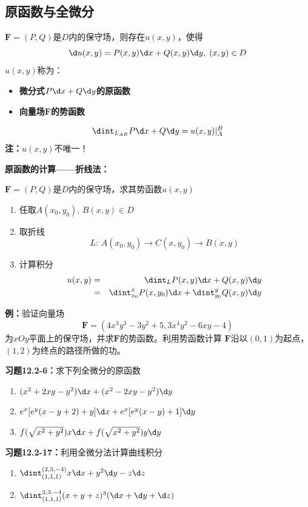 \subsection{原函数与全微分}

$\bm{F}=(P,Q)$是$D$内的保守场，则存在$u(x,y)$，使得
$$\d u(x,y)=P(x,y)\d x+Q(x,y)\d y,\;(x,y)\in D$$
 $u(x,y)$称为： 
\begin{itemize}
  \item {\bf 微分式$P\d x+Q\d y$的原函数} 
  \item {\bf 向量场$\bm{F}$的势函数} 
\end{itemize}
\bigskip
$${\dint_{L_{AB}}P\d x+Q\d y=u(x,y)|_A^B} $$
{\bf 注：}$u(x,y)$不唯一！

{\bf 原函数的计算——折线法：}

$\bm{F}=(P,Q)$是$D$内的保守场，求其势函数$u(x,y)$

\begin{enumerate}[Step1]
  \setlength{\itemindent}{1cm}
  \item 任取$A(x_0,y_0),\,B(x,y)\in D$ 
  \item 取折线
  $${L:\,A(x_0,y_0)\to C(x,y_0)\to B(x,y)} $$
  \item 计算积分
  \begin{eqnarray*}
  	u(x,y)&=&\dint_LP(x,y)\d x+Q(x,y)\d y \\
  	&=&{\dint_{x_0}^xP(x,y_0)\d x+\dint_{y_0}^yQ(x,y)\d y}
  \end{eqnarray*}
\end{enumerate}

{\bf 例：}验证向量场
$$\bm{F}=(4x^3y^3-3y^2+5,3x^4y^2-6xy-4)$$
为$xOy$平面上的保守场，并求$\bm{F}$的势函数。利用势函数计算
$\bm{F}$沿以$(0,1)$为起点，$(1,2)$为终点的路径所做的功。

{\bf 习题12.2-6：}求下列全微分的原函数
\begin{enumerate}[(1)]
  \setlength{\itemindent}{1cm}
  \item $(x^2+2xy-y^2)\d x+(x^2-2xy-y^2)\d y$
  \item $e^x[e^y(x-y+2)+y]\d x+e^x[e^y(x-y)+1]\d y$
  \item $f(\sqrt{x^2+y^2})x\d x+f(\sqrt{x^2+y^2})y\d y$
\end{enumerate}

{\bf 习题12.2-17：}利用全微分法计算曲线积分
\begin{enumerate}[(1)]
  \setlength{\itemindent}{1cm}
  \item $\dint_{(1,1,1)}^{(2,3,-4)}x\d x+y^2\d y-z\d z$
  \item $\dint_{(1,1,1)}^{2,3,-4}(x+y+z)^3(\d x+\d y+\d z)$
\end{enumerate}

